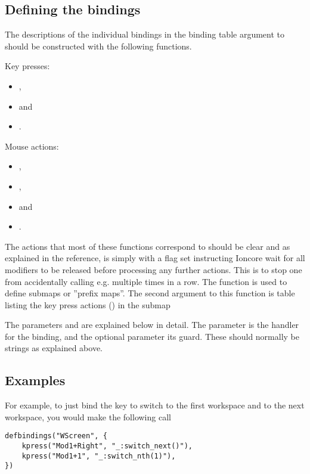 \subsection{Defining the bindings}
\label{sec:binddef}

The descriptions of the individual bindings in the binding table argument
to  should be constructed with the following
functions.

Key presses:
\begin{itemize}
    \item {},
    \item {} and
    \item {}.
\end{itemize}
Mouse actions:
\begin{itemize}
    \item {},
    \item {}, 
    \item {} and
    \item {}.
\end{itemize}

The actions that most of these functions correspond to should be clear
and as explained in the reference,  is simply
 with a flag set instructing Ioncore wait for all
modifiers to be released before processing any further actions.
This is to stop one from accidentally calling e.g.
 multiple times in a row. The 
function is used to define submaps or ''prefix maps''. The second
argument to this function is table listing the key press actions
() in the submap

The parameters  and  are explained below
in detail. The parameter  is the handler for the binding,
and the optional parameter  its guard. These should normally
be strings as explained above. 

\subsection{Examples}

For example, to just bind the key  to switch to the first
workspace and  to the next workspace, you would make the
following call
\begin{verbatim}
defbindings("WScreen", {
    kpress("Mod1+Right", "_:switch_next()"),
    kpress("Mod1+1", "_:switch_nth(1)"),
})
\end{verbatim}

